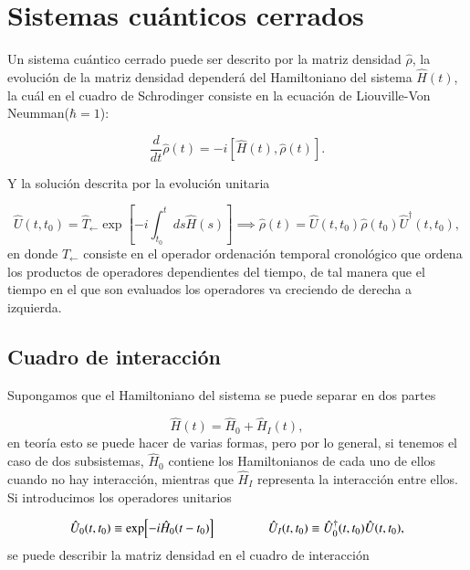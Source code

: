 \section{Sistemas cuánticos cerrados}
Un sistema cuántico cerrado puede ser descrito por la matriz densidad $\hat{\rho}$, la evolución de la matriz densidad dependerá del Hamiltoniano del sistema $\hat{H}(t)$, la cuál en el cuadro de Schrodinger consiste en la ecuación de Liouville-Von Neumman($\hbar = 1$)\cite{breuer2002theory}:

\begin{equation*}
    \frac{d}{dt}\hat{\rho}(t) = -i[\hat{H}(t),\hat{\rho}(t)].
\end{equation*}

Y la solución descrita por la evolución unitaria 

\begin{equation*}
    \hat{U}(t,t_{0}) = \hat{T}_{\leftarrow} \exp \left[ -i \int_{t_{0}}^{t}ds \hat{H}(s) \right] \implies \hat{\rho}(t) = \hat{U}(t,t_{0})\hat{\rho}(t_{0})\hat{U}^{\dagger}(t,t_{0}),
\end{equation*}
en donde $\hat{T}_{\leftarrow}$ consiste en el operador ordenación temporal cronológico que ordena los productos de operadores dependientes del tiempo, de tal manera que el tiempo en el que son evaluados los operadores va creciendo de derecha a izquierda.

\subsection{Cuadro de interacción}
Supongamos que el Hamiltoniano del sistema se puede separar en dos partes

\begin{equation*}
    \hat{H}(t) = \hat{H}_{0} + \hat{H}_{I}(t),
\end{equation*}
en teoría esto se puede hacer de varias formas, pero por lo general, si tenemos el caso de dos subsistemas, $\hat{H}_{0}$ contiene los Hamiltonianos de cada uno de ellos cuando no hay interacción, mientras que $\hat{H}_{I}$ representa la interacción entre ellos. Si introducimos los operadores unitarios

\begin{equation*}
    \hat{U}_{0}(t,t_{0}) \equiv \exp[-i\hat{H}_{0}(t-t_{0}) ]  \hspace{15mm} \hat{U}_{I}(t,t_0) \equiv \hat{U}^{\dagger}_{0}(t,t_{0})\hat{U}(t,t_{0}),
\end{equation*}
se puede describir la matriz densidad en el cuadro de interacción

